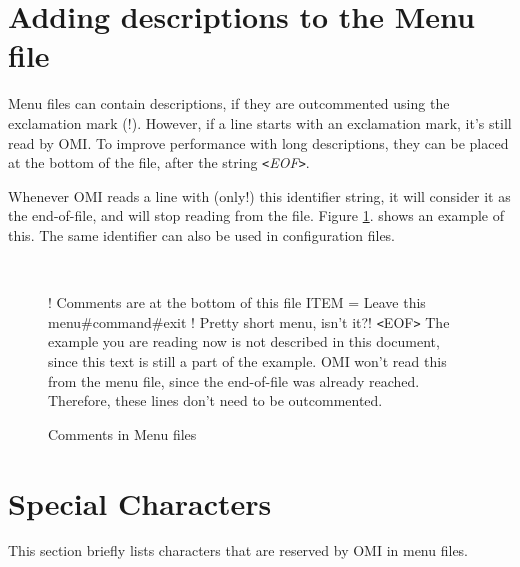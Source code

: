 \documentclass[a4paper]{book}
\newcommand{\vs}{\vspace{3mm}}
\newcommand{\lt}{\texttt{<}}
\newcommand{\gt}{\texttt{>}}
\renewcommand{\indent}{\hspace*{5mm}}
\begin{document}
\section{Adding descriptions to the Menu file}
\label{subsec:adding}

Menu files can contain descriptions, if they are outcommented using the 
exclamation mark (!). However, if a line starts with an exclamation mark, 
it's still read by OMI. To improve performance with long descriptions, they 
can be placed at the bottom of the file, after the string
\textsl{\lt EOF\gt}.

\vs

Whenever OMI reads a line with (only!) this identifier string, it will 
consider it as the end-of-file, and will stop reading from the file. Figure \ref{fig:comments}.
shows an example of this.
The same identifier can also be used in configuration files.

\begin{figure}[h!tb]
\begin{minipage}[h!tb]{\textwidth}
\hrulefill \\
\begin{ttfamily}
\noindent! Comments are at the bottom of this file \newline
{} \newline
\indent ITEM = Leave this menu{\#}command{\#}exit \newline
\noindent! Pretty short menu, isn't it?! \newline
\noindent\lt EOF\gt \newline
\noindent The example you are reading now is not described in this document, 
since this text is still a part of the example. \newline
OMI won't read this from the menu file, since the end-of-file was 
already reached. Therefore, these lines don't need to be outcommented.
\end{ttfamily}
\caption{Comments in Menu files}\label{fig:comments}
\hrulefill
\end{minipage}
\end{figure}

\section{Special Characters}
\label{subsec:special}

This section briefly lists characters that are reserved by OMI in menu 
files.
\end{document}
